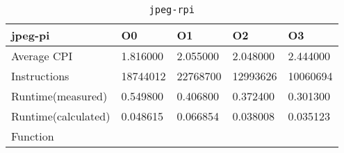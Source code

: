 \begin{table}[ht!]
\centering
\caption{\texttt{jpeg-rpi}}
\label{tab:jpeg-rpi}
\begin{tabular}{|l|l|l|l|l|}
\hline
\textbf{jpeg-pi}	&	\textbf{O0}	&	\textbf{O1}	&	\textbf{O2}	&	\textbf{O3}	\\\hline\hline
Average CPI	&	1.816000	&	2.055000	&	2.048000	&	2.444000	\\\hline
Instructions	&	18744012	&	22768700	&	12993626	&	10060694	\\\hline
Runtime(measured)	&	0.549800	&	0.406800	&	0.372400	&	0.301300	\\\hline
Runtime(calculated)	&	0.048615	&	0.066854	&	0.038008	&	0.035123	\\\hline
Function	&		&		&		&		\\\hline
\end{tabular}
\end{table}
